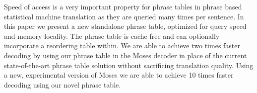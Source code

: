 Speed of access is a very important property for phrase tables in phrase based statistical machine translation as they are queried many times per sentence. In this paper we present a new standalone phrase table, optimized for query speed and memory locality. The phrase table is cache free and can optionally incorporate a reordering table within. We are able to achieve two times faster decoding by using our phrase table in the Moses decoder in place of the current state-of-the-art phrase table solution without sacrificing translation quality. Using a new, experimental version of Moses we are able to achieve 10 times faster decoding using our novel phrase table.
